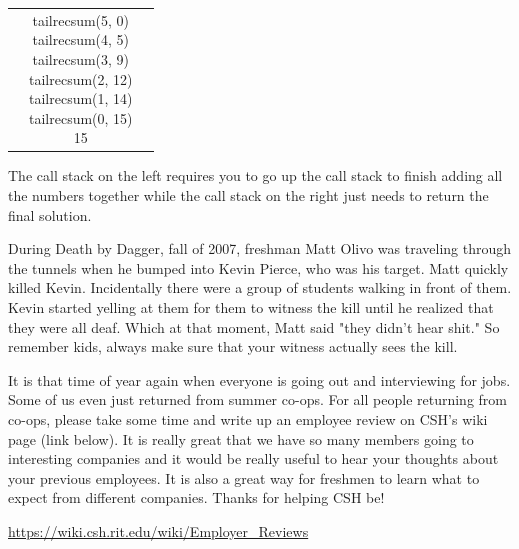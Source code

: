 \documentclass[9pt]{extarticle} %
\begin{document}
\begin{minipage}[t]{.66\linewidth}
\begin{tabular}{ l c r }
&
\makecell{
tailrecsum(5, 0) \\
tailrecsum(4, 5) \\
tailrecsum(3, 9) \\
tailrecsum(2, 12) \\
tailrecsum(1, 14) \\
tailrecsum(0, 15) \\
15 \\}
\end{tabular}

The call stack on the left requires you to go up the call stack to finish
adding all the numbers together while the call stack on the right just
needs to return the final solution.


\hypertarget{secondnews}{} 

During Death by Dagger, fall of 2007, freshman Matt Olivo was traveling 
through the tunnels when he bumped into Kevin Pierce, who was his target.
Matt quickly killed Kevin. Incidentally there were a group of students walking
in front of them. Kevin started yelling at them for them to witness the kill
until he realized that they were all deaf. Which at that moment, Matt said 
"they didn't hear shit." So remember kids, always make sure that your witness
actually sees the kill.

\hypertarget{thirdnews}{} 

It is that time of year again when everyone is going out and interviewing for 
jobs. Some of us even just returned from summer co-ops. For all people returning from co-ops, please take some time and write up an employee review on CSH's 
wiki page (link below). It is really great that we have so many members going
to interesting companies and it would be really useful to hear your thoughts
about your previous employees. It is also a great way for freshmen to learn 
what to expect from different companies. Thanks for helping CSH be!
\centerline{\url{https://wiki.csh.rit.edu/wiki/Employer_Reviews}}

\end{minipage} %
\end{document}
